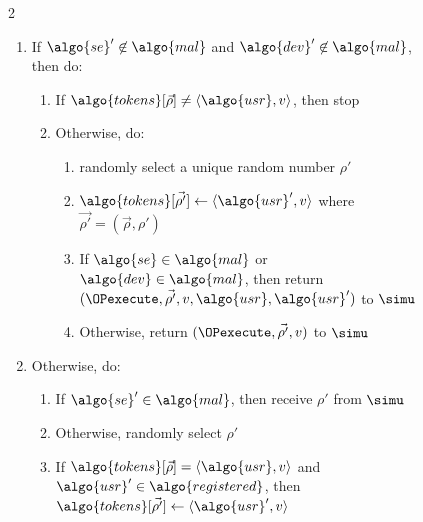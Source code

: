 \begin{figure}
\begin{minipage}{1.1\textwidth}
\begin{framed}
\begin{multicols}{2}
        \begin{enumerate}

          \item If $\algo{se}' \not\in \algo{mal}$ and $\algo{dev}' \not\in
            \algo{mal}$, then do:

            \begin{enumerate}

              \item If $\algo{tokens}[\vec{\rho}] \neq \langle \algo{usr}, v
                \rangle$, then stop

              \item Otherwise, do:

                \begin{enumerate}

                  \item randomly select a unique random number $\rho'$

                  \item $\algo{tokens}[\vec{\rho'}] \gets \langle\algo{usr}', v
                    \rangle$ where $\vec{\rho'} = (\vec{\rho}, \rho')$

                  \item If $\algo{se} \in \algo{mal}$ or $\algo{dev} \in
                    \algo{mal}$, then return $(\OPexecute, \vec{\rho'}, v,
                    \algo{usr}, \algo{usr}')$ to $\simu$

                  \item Otherwise, return $(\OPexecute, \vec{\rho'}, v)$ to
                    $\simu$

                \end{enumerate}

            \end{enumerate}

          \item Otherwise, do:

            \begin{enumerate}

              \item If $\algo{se}' \in \algo{mal}$, then receive $\rho'$ from
                $\simu$

              \item Otherwise, randomly select $\rho'$

              \item If $\algo{tokens}[\vec{\rho}] = \langle \algo{usr}, v
                \rangle$ and $\algo{usr}' \in \algo{registered}$, then
                $\algo{tokens}[\vec{\rho'}] \leftarrow \langle \algo{usr}', v
                \rangle$


\end{enumerate}
\end{enumerate}
\end{multicols}
\end{framed}
\end{minipage}
\end{figure}
